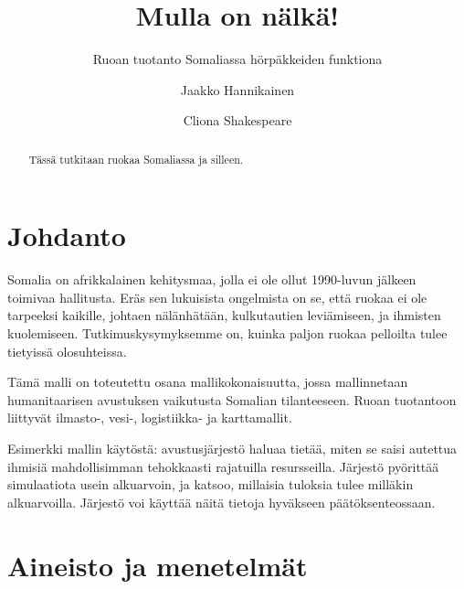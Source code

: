 \documentclass[12pt]{scrreprt}
\title{Mulla on nälkä!}
\subtitle{Ruoan tuotanto Somaliassa hörpäkkeiden funktiona}
\author{Jaakko Hannikainen \and Cliona Shakespeare}
\date{}
\begin{document}
  \maketitle

  \begin{abstract}
    Tässä tutkitaan ruokaa Somaliassa ja silleen.
  \end{abstract}

  \tableofcontents

  \chapter{Johdanto}

  
  Somalia on afrikkalainen kehitysmaa, jolla ei ole ollut 1990-luvun jälkeen
  toimivaa hallitusta. Eräs sen lukuisista ongelmista on se, että ruokaa ei ole
  tarpeeksi kaikille, johtaen nälänhätään, kulkutautien leviämiseen, ja ihmisten
  kuolemiseen. Tutkimuskysymyksemme on, kuinka paljon ruokaa pelloilta tulee
  tietyissä olosuhteissa.
  
  Tämä malli on toteutettu osana mallikokonaisuutta, jossa mallinnetaan
  humanitaarisen avustuksen vaikutusta Somalian tilanteeseen. Ruoan tuotantoon
  liittyvät ilmasto-, vesi-, logistiikka- ja karttamallit.
  
  Esimerkki mallin käytöstä: avustusjärjestö haluaa tietää, miten se saisi
  autettua ihmisiä mahdollisimman tehokkaasti rajatuilla resursseilla. Järjestö
  pyörittää simulaatiota usein alkuarvoin, ja katsoo, millaisia tuloksia tulee
  milläkin alkuarvoilla. Järjestö voi käyttää näitä tietoja hyväkseen
  päätöksenteossaan.
  
  
  
  
  
  
  \chapter{Aineisto ja menetelmät}
\end{document}
